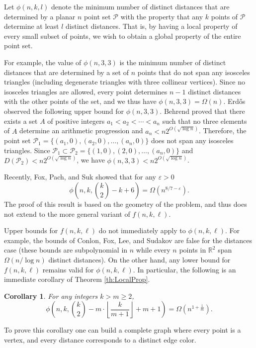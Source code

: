 \documentclass[11pt]{article}
\newtheorem{corollary}[theorem]{Corollary}
\newcommand{\RR}{\ensuremath{\mathbb R}}
\newcommand{\pts}{\mathcal P}
\def\eps{{\varepsilon}}
\begin{document}
Let $\phi(n,k,l)$ denote the minimum number of distinct distances that are determined by a planar $n$ point set $\pts$ with the property that any $k$ points of $\pts$ determine at least $l$ distinct distances. That is, by having a local property of every small subset of points, we wish to obtain a global property of the entire point set.

For example, the value of $\phi(n,3,3)$ is the minimum number of distinct distances that are determined by a set of $n$ points that do not span any isosceles triangles (including degenerate triangles with three collinear vertices).
Since no isosceles triangles are allowed, every point determines $n-1$ distinct distances with the other points of the set, and we thus have $\phi(n,3,3) = \Omega(n)$.
Erd\H os \cite{Erdos86} observed the following upper bound for $\phi(n,3,3)$.
Behrend \cite{Behrend46} proved that there exists a set $A$ of positive integers $a_1< a_2 < \cdots < a_n$ such that no three elements of $A$ determine an arithmetic progression and $a_n < n2^{O(\sqrt{\log n})}$.
Therefore, the point set $\pts_1 = \{(a_1,0), (a_2,0),\ldots, (a_n,0)\}$ does not span any isosceles triangles.
Since $\pts_1 \subset \pts_2 = \{(1,0),(2,0),\ldots,(a_n,0) \}$ and $D(\pts_2)< n2^{O(\sqrt{\log n})}$, we have $\phi(n,3,3) < n2^{O(\sqrt{\log n})}$.

Recently, Fox, Pach, and Suk \cite{FPS17} showed that for any $\eps>0$
%
\[ \phi\left(n,k,\binom{k}{2}-k+6\right) = \Omega\left(n^{8/7-\eps}\right).\]
%
The proof of this result is based on the geometry of the problem, and thus does not extend to the more general variant of $f(n,k,\ell)$.

Upper bounds for $f(n,k,\ell)$ do not immediately apply to $\phi(n,k,\ell)$.
For example, the bounds of Conlon, Fox, Lee, and Sudakov \cite{CFLS14} are false for the distances case (these bounds are subpolynomial in $n$ while every $n$ points in $\RR^2$ span $\Omega(n/\log n)$ distinct distances).
On the other hand, any lower bound for $f(n,k,\ell)$ remains valid for $\phi(n,k,\ell)$.
In particular, the following is an immediate corollary of Theorem \ref{th:LocalProp}.
%
\begin{corollary} \label{co:LocalDist}
For any integers $k > m \ge 2$,
%
\[ \phi\left(n,k,\binom{k}{2} -  m\cdot \left\lfloor\frac{k}{m+1}\right\rfloor  + m+1 \right) = \Omega\left(n^{1+\frac{1}{m}}\right). \]
\end{corollary}
%
To prove this corollary one can build a complete graph where every point is a vertex, and every distance corresponds to a distinct edge color.
\end{document}
